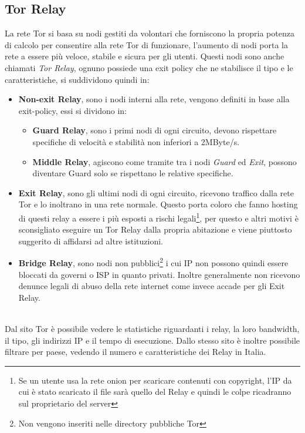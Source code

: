 \subsection{Tor Relay}
La rete Tor si basa su nodi gestiti da volontari che forniscono la propria potenza di calcolo per consentire alla rete Tor di funzionare, l'aumento di nodi porta la rete a essere più veloce, stabile e sicura per gli utenti. Questi nodi sono anche chiamati \emph{Tor Relay}, ognuno possiede una exit policy che ne stabilisce il tipo e le caratteristiche, si suddividono quindi in:
\begin{itemize}
    \item \textbf{Non-exit Relay}, sono i nodi interni alla rete, vengono definiti in base alla exit-policy, essi si dividono in:
    \begin{itemize}
        \item \textbf{Guard Relay}, sono i primi nodi di ogni circuito, devono rispettare specifiche di velocità e stabilità non inferiori a 2MByte/s.
        \item \textbf{Middle Relay}, agiscono come tramite tra i nodi \emph{Guard} ed \emph{Exit}, possono diventare Guard solo se rispettano le relative specifiche.
    \end{itemize}
    \item \textbf{Exit Relay}, sono gli ultimi nodi di ogni circuito, ricevono traffico dalla rete Tor e lo inoltrano in una rete normale. Questo porta coloro che fanno hosting di questi relay a essere i più esposti a rischi legali\footnote{Se un utente usa la rete onion per scaricare contenuti con copyright, l'IP da cui è stato scaricato il file sarà quello del Relay e quindi le colpe ricadranno sul proprietario del server}, per questo e altri motivi è sconsigliato eseguire un Tor Relay dalla propria abitazione e viene piuttosto suggerito di affidarsi ad altre istituzioni.
    \item \textbf{Bridge Relay}, sono nodi non pubblici\footnote{Non vengono inseriti nelle directory pubbliche Tor} i cui IP non possono quindi essere bloccati da governi o ISP in quanto privati. Inoltre generalmente non ricevono denunce legali di abuso della rete internet come invece accade per gli Exit Relay.
\end{itemize}
\cite{TorRelay}
\cite{TorRelayTypes} \\
Dal sito Tor \cite{TorRelayMetrics} è possibile vedere le statistiche riguardanti i relay, la loro bandwidth, il tipo, gli indirizzi IP e il tempo di esecuzione. Dallo stesso sito è inoltre possibile filtrare per paese, vedendo il numero e caratteristiche dei Relay in Italia. \\


